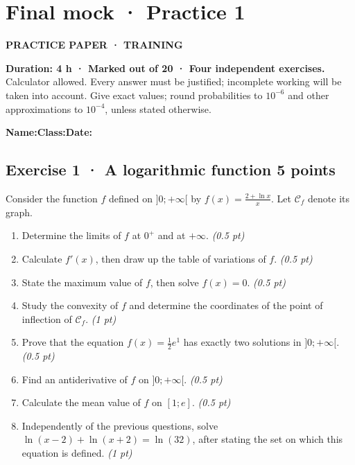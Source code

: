 \clearpage{}\label{sujet:9-1}

\section*{Final mock · Practice 1}

{\sffamily\bfseries\color{teal}PRACTICE PAPER · TRAINING\par}

\textbf{Duration: 4 h · Marked out of 20 · Four independent exercises.}\\Calculator allowed. Every answer must be justified; incomplete working will be taken into account. Give exact values; round probabilities to $10^{-6}$ and other approximations to $10^{-4}$, unless stated otherwise.

\smallskip\textbf{Name:}\enspace\dotfill\quad\textbf{Class:}\enspace\dotfill\quad\textbf{Date:}\enspace\dotfill

\subsection*{Exercise 1 · A logarithmic function \hfill 5 points}Consider the function $f$ defined on $]0;+\infty[$ by $f(x)=\frac{2+\ln x}x$. Let $\mathcal C_f$ denote its graph.

\begin{enumerate}

\item Determine the limits of $f$ at $0^+$ and at $+\infty$. \hfill\textit{(0.5 pt)}

\item Calculate $f' (x)$, then draw up the table of variations of $f$. \hfill\textit{(0.5 pt)}

\item State the maximum value of $f$, then solve $f(x)=0$. \hfill\textit{(0.5 pt)}

\item Study the convexity of $f$ and determine the coordinates of the point of inflection of $\mathcal C_f$. \hfill\textit{(1 pt)}

\item Prove that the equation $f(x)=\frac12 e^{1}$ has exactly two solutions in $]0;+\infty[$. \hfill\textit{(0.5 pt)}

\item Find an antiderivative of $f$ on $]0;+\infty[$. \hfill\textit{(0.5 pt)}

\item Calculate the mean value of $f$ on $[1;e]$. \hfill\textit{(0.5 pt)}

\item Independently of the previous questions, solve $\ln(x-2)+\ln(x+2)=\ln(32)$, after stating the set on which this equation is defined. \hfill\textit{(1 pt)}

\end{enumerate}

